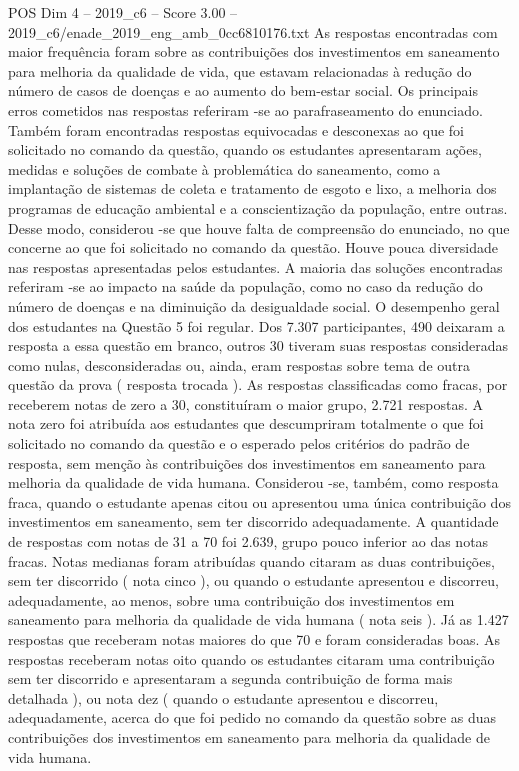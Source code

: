 \begin{textsample}{POS Dim 4 – 2019\_c6 – Score 3.00 – 2019\_c6/enade\_2019\_eng\_amb\_0cc6810176.txt}
As respostas encontradas com maior frequência foram sobre as contribuições dos investimentos em saneamento para melhoria da qualidade de vida, que estavam relacionadas à redução do número de casos de doenças e ao aumento do bem-estar social.
Os principais erros cometidos nas respostas referiram -se ao parafraseamento do enunciado.
Também foram encontradas respostas equivocadas e desconexas ao que foi solicitado no comando da questão, quando os estudantes apresentaram ações, medidas e soluções de combate à problemática do saneamento, como a implantação de sistemas de coleta e tratamento de esgoto e lixo, a melhoria dos programas de educação ambiental e a conscientização da população, entre outras.
Desse modo, considerou -se que houve falta de compreensão do enunciado, no que concerne ao que foi solicitado no comando da questão.
Houve pouca diversidade nas respostas apresentadas pelos estudantes.
A maioria das soluções encontradas referiram -se ao impacto na saúde da população, como no caso da redução do número de doenças e na diminuição da desigualdade social.
O desempenho geral dos estudantes na Questão 5 foi regular.
Dos 7.307 participantes, 490 deixaram a resposta a essa questão em branco, outros 30 tiveram suas respostas consideradas como nulas, desconsideradas ou, ainda, eram respostas sobre tema de outra questão da prova ( resposta trocada ).
As respostas classificadas como fracas, por receberem notas de zero a 30, constituíram o maior grupo, 2.721 respostas.
A nota zero foi atribuída aos estudantes que descumpriram totalmente o que foi solicitado no comando da questão e o esperado pelos critérios do padrão de resposta, sem menção às contribuições dos investimentos em saneamento para melhoria da qualidade de vida humana.
Considerou -se, também, como resposta fraca, quando o estudante apenas citou ou apresentou uma única contribuição dos investimentos em saneamento, sem ter discorrido adequadamente.
A quantidade de respostas com notas de 31 a 70 foi 2.639, grupo pouco inferior ao das notas fracas.
Notas medianas foram atribuídas quando citaram as duas contribuições, sem ter discorrido ( nota cinco ), ou quando o estudante apresentou e discorreu, adequadamente, ao menos, sobre uma contribuição dos investimentos em saneamento para melhoria da qualidade de vida humana ( nota seis ).
Já as 1.427 respostas que receberam notas maiores do que 70 e foram consideradas boas.
As respostas receberam notas oito quando os estudantes citaram uma contribuição sem ter discorrido e apresentaram a segunda contribuição de forma mais detalhada ), ou nota dez ( quando o estudante apresentou e discorreu, adequadamente, acerca do que foi pedido no comando da questão sobre as duas contribuições dos investimentos em saneamento para melhoria da qualidade de vida humana.

\end{textsample}
